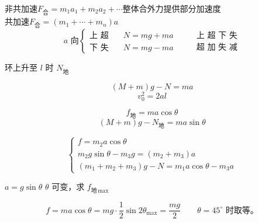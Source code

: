 \noindent 非共加速\quad $F_{\text{合}}=m_1a_1+m_2a_2+\cdots$\quad 整体合外力提供部分加速度 \\
共加速\quad $F_{\text{合}}=(m_1+\cdots+m_n)a$
\[ a\text{ 向}\left\{\begin{array}{ll}\text{上 超}&\quad N=mg+ma\\ \text{下 失}&\quad N=mg-ma\end{array}\right.\qquad \begin{array}{l}\text{上 超 下 失}\\ \text{超 加 失 减}\end{array} \]
\begin{problem}
环上升至 $l$ 时 $N_{\text{地}}$
\begin{solution}
\[ (M+m)g-N=ma \]
\[ v_0^2=2al \]
\end{solution}
\end{problem}
\begin{problem}
\begin{solution}
\[ f_{\text{地}}=ma\cos\theta \]
\[ (M+m)g-N_{\text{地}}=ma\sin\theta \]
\end{solution}
\end{problem}
\begin{problem}
\begin{solution}
\[ \begin{cases} f=m_2a\cos\theta\\ m_2g\sin\theta-m_3g=(m_2+m_3)a\\ (m_1+m_2+m_3)g-N=m_1a\cos\theta-m_3a\end{cases} \]
\end{solution}
\end{problem}
\begin{problem}
$a=g\sin\theta$
$\theta$ 可变，求 $f_{\text{地}\,\max}$
\begin{solution}
\[ f=ma\cos\theta=mg\cdot\frac12\sin2\theta_{\max}=\frac{mg}{2}\qquad \theta=45^\circ\text{ 时取等。} \]
\end{solution}
\end{problem}
